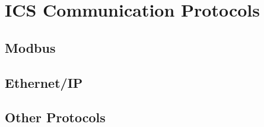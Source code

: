 \section{ICS Communication Protocols}
\label{sec:ics_protocols}

\subsection{Modbus}

\subsection{Ethernet/IP}

\subsection{Other Protocols}

\vfill
%
%
%
